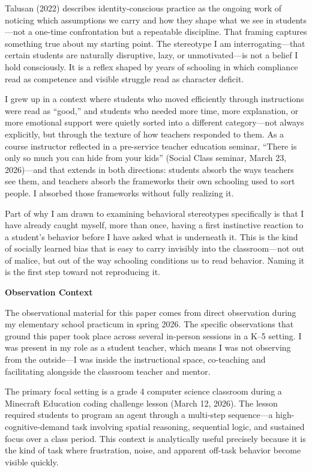 \documentclass[12pt]{article}
\newcommand{\apaheading}[1]{\begin{center}\textbf{#1}\end{center}}
\begin{document}
Talusan (2022) describes identity-conscious practice as the ongoing work of noticing which assumptions we carry and how they shape what we see in students---not a one-time confrontation but a repeatable discipline. That framing captures something true about my starting point. The stereotype I am interrogating---that certain students are naturally disruptive, lazy, or unmotivated---is not a belief I hold consciously. It is a reflex shaped by years of schooling in which compliance read as competence and visible struggle read as character deficit.

I grew up in a context where students who moved efficiently through instructions were read as ``good,'' and students who needed more time, more explanation, or more emotional support were quietly sorted into a different category---not always explicitly, but through the texture of how teachers responded to them. As a course instructor reflected in a pre-service teacher education seminar, ``There is only so much you can hide from your kids'' (Social Class seminar, March 23, 2026)---and that extends in both directions: students absorb the ways teachers see them, and teachers absorb the frameworks their own schooling used to sort people. I absorbed those frameworks without fully realizing it.

Part of why I am drawn to examining behavioral stereotypes specifically is that I have already caught myself, more than once, having a first instinctive reaction to a student's behavior before I have asked what is underneath it. This is the kind of socially learned bias that is easy to carry invisibly into the classroom---not out of malice, but out of the way schooling conditions us to read behavior. Naming it is the first step toward not reproducing it.

\apaheading{Observation Context}

The observational material for this paper comes from direct observation during my elementary school practicum in spring 2026. The specific observations that ground this paper took place across several in-person sessions in a K--5 setting. I was present in my role as a student teacher, which means I was not observing from the outside---I was inside the instructional space, co-teaching and facilitating alongside the classroom teacher and mentor.

The primary focal setting is a grade 4 computer science classroom during a Minecraft Education coding challenge lesson (March 12, 2026). The lesson required students to program an agent through a multi-step sequence---a high-cognitive-demand task involving spatial reasoning, sequential logic, and sustained focus over a class period. This context is analytically useful precisely because it is the kind of task where frustration, noise, and apparent off-task behavior become visible quickly.
\end{document}
